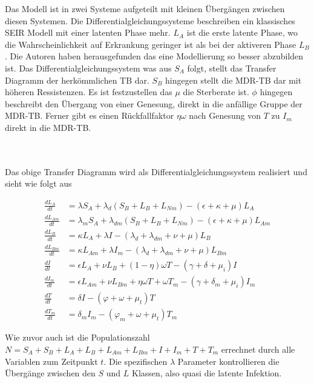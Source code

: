 \documentclass[paper=a4, fontsize=11pt, ngerman, abstract=on]{scrartcl}
\numberwithin{equation}{section} %
\numberwithin{figure}{section} %
\numberwithin{table}{section} %
\begin{document}
\begin{minipage}{0.55\linewidth}
Das Modell ist in zwei Systeme aufgeteilt mit kleinen Übergängen zwischen diesen Systemen. Die Differentialgleichungssysteme beschreiben ein klassisches SEIR Modell mit einer latenten Phase mehr. $L_{A}$ ist die erste latente Phase, wo die Wahrscheinlichkeit auf Erkrankung geringer ist als bei der aktiveren Phase $L_{B}$. Die Autoren haben herausgefunden das eine Modellierung so besser abzubilden ist. Das Differentialgleichungssystem was aus $S_{A}$ folgt, stellt das Transfer Diagramm der herkömmlichen TB dar. $S_{B}$ hingegen stellt die MDR-TB dar mit höheren Ressistenzen. Es ist festzustellen das $\mu$ die Sterberate ist. $\phi$ hingegen beschreibt den Übergang von einer Genesung, direkt in die anfällige Gruppe der MDR-TB. Ferner gibt es einen Rückfallfaktor $\eta \omega$ nach Genesung von $T$ zu $I_{m}$ direkt in die MDR-TB.
\end{minipage}\\\\

Das obige Transfer Diagramm wird als Differentialgleichungssystem realisiert und sieht wie folgt aus

\begin{equation}
\begin{split}
\frac{dL_{A}}{dt} &= \lambda S_{A} + \lambda_{d}(S_{B} + L_{B} + L_{Nm}) - (\epsilon + \kappa + \mu)L_{A} \\
\frac{dL_{Am}}{dt} &= \lambda_{m} S_{A} + \lambda_{dm}(S_{B} + L_{B} + L_{Nm}) - (\epsilon + \kappa + \mu)L_{Am} \\
\frac{dL_{B}}{dt} &= \kappa L_{A} + \lambda I - (\lambda_{d} + \lambda_{dm} + \nu + \mu) L_{B} \\
\frac{dL_{Bm}}{dt} &= \kappa L_{Am} + \lambda I_{m} - (\lambda_{d} + \lambda _{dm} + \nu + \mu) L_{Bm} \\
\frac{dI}{dt} &= \epsilon L_{A} + \nu L_{B} + (1 - \eta)\omega T - (\gamma + \delta + \mu_{i})I \\
\frac{dI_{m}}{dt} &= \epsilon L_{Am} + \nu L_{Bm} + \eta \omega T + \omega T_{m} - (\gamma + \delta_{m} + \mu_{i})I_{m} \\
\frac{dT}{dt} &= \delta I - (\varphi + \omega + \mu_{t}) T \\
\frac{dT_{m}}{dt} &= \delta _{m} I_{m} - (\varphi _{m} + \omega + \mu_{t}) T_{m}
\end{split}
\label{eq:dgls-mdr-tb}
\end{equation}

Wie zuvor auch ist die Populationszahl $N = S_{A} + S_{B} + L_{A} + L_{B} + L_{Am} + L_{Bm} + I + I_{m} + T + T_{m}$ errechnet durch alle Variablen zum Zeitpunkt $t$. Die spezifischen $\lambda$ Parameter kontrollieren die Übergänge zwischen den $S$ und $L$ Klassen, also quasi die latente Infektion.
\end{document}
